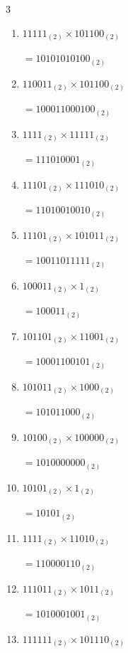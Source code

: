 \begin{multicols}{3}
\begin{enumerate}
        $=10000_{(2)}$

  \item $11111_{(2)} \times 101100_{(2)}$

        $=10101010100_{(2)}$

  \item $110011_{(2)} \times 101100_{(2)}$

        $=100011000100_{(2)}$

\columnbreak %

  \item $1111_{(2)} \times 11111_{(2)}$

        $=111010001_{(2)}$

  \item $11101_{(2)} \times 111010_{(2)}$

        $=11010010010_{(2)}$

  \item $11101_{(2)} \times 101011_{(2)}$

        $=10011011111_{(2)}$

  \item $100011_{(2)} \times 1_{(2)}$

        $=100011_{(2)}$

  \item $101101_{(2)} \times 11001_{(2)}$

        $=10001100101_{(2)}$

\columnbreak %

\resetques

  \item $101011_{(2)} \times 1000_{(2)}$

        $=101011000_{(2)}$

  \item $10100_{(2)} \times 100000_{(2)}$

        $=1010000000_{(2)}$

  \item $10101_{(2)} \times 1_{(2)}$

        $=10101_{(2)}$

  \item $1111_{(2)} \times 11010_{(2)}$

        $=110000110_{(2)}$

  \item $111011_{(2)} \times 1011_{(2)}$

        $=1010001001_{(2)}$

\columnbreak %

  \item $111111_{(2)} \times 101110_{(2)}$


\end{enumerate}
\end{multicols}
